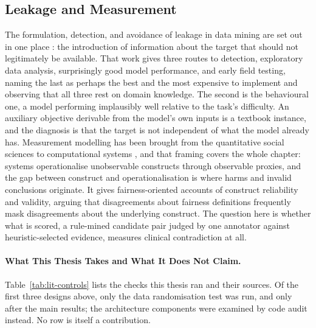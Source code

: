 \subsection{Leakage and Measurement}

The formulation, detection, and avoidance of leakage in data mining are set out in one place \citep{kaufman2012leakage}:
the introduction of information about the target that should not legitimately be available. That work
gives three routes to detection, exploratory data analysis, surprisingly good model performance, and
early field testing, naming the last as perhaps the best and the most expensive to implement and
observing that all three rest on domain knowledge. The second is the behavioural one, a model
performing implausibly well relative to the task's difficulty. An auxiliary objective derivable from the model's own inputs is a textbook
instance, and the diagnosis is that the target is not independent of what the model already has.
Measurement modelling has been brought from the quantitative social sciences to
computational systems \citep{jacobs2021measurement}, and that framing covers the whole chapter: systems operationalise
unobservable constructs through observable proxies, and the gap between construct and
operationalisation is where harms and invalid conclusions originate. It gives fairness-oriented
accounts of construct reliability and validity, arguing that disagreements about fairness definitions
frequently mask disagreements about the underlying construct. The question here is whether what is scored, a rule-mined candidate pair judged by one annotator against heuristic-selected evidence, measures clinical contradiction at all.

\paragraph{What This Thesis Takes and What It Does Not Claim.}
Table~\ref{tab:lit-controls} lists the checks this thesis ran and their sources. Of the first three designs above, only the data randomisation test was run, and only after the main results; the architecture components were examined by code audit instead. No row is itself a contribution.

